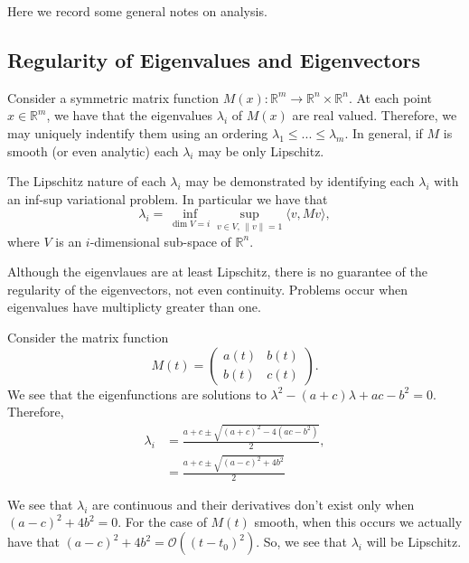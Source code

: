 Here we record some general notes on analysis.

\subsection{Regularity of Eigenvalues and Eigenvectors}

Consider a symmetric matrix function $M(x): \mathbb R^m \to \mathbb R^n\times \mathbb R^n$. At each point $x\in \mathbb R^m$, we have that the eigenvalues $\lambda_i$ of $M(x)$ are real valued. Therefore, we may uniquely indentify them using an ordering $\lambda_1 \leq ... \leq \lambda_m$. In general, if $M$ is smooth (or even analytic) each $\lambda_i$ may be only Lipschitz.

The Lipschitz nature of each $\lambda_i$ may be demonstrated by identifying each $\lambda_i$ with an inf-sup variational problem. In particular we have that
\begin{equation}
\lambda_i = \inf\limits_{\dim V = i} \sup\limits_{v\in V, \, \|v\| = 1} \langle v, Mv\rangle,
\end{equation}
where $V$ is an $i$-dimensional sub-space of $\mathbb R^n$.

Although the eigenvlaues are at least Lipschitz, there is no guarantee of the regularity of the eigenvectors, not even continuity. Problems occur when eigenvalues have multiplicty greater than one.

Consider the matrix function
\begin{equation}
M(t) = \begin{pmatrix}
a(t) & b(t)\\
b(t) & c(t)
\end{pmatrix}.
\end{equation}
We see that the eigenfunctions are solutions to $\lambda^2 - (a + c)\lambda + ac-b^2 = 0$. Therefore,
\begin{align}
\lambda_i & = \frac{a+c \pm \sqrt{(a+c)^2 - 4(ac - b^2)}}{2},\\
& = \frac{a+c \pm \sqrt{(a-c)^2 + 4 b^2}}{2}
\end{align}

We see that $\lambda_i$ are continuous and their derivatives don't exist only when $(a-c)^2 + 4b^2 = 0.$ For the case of $M(t)$ smooth, when this occurs we actually have that $(a-c)^2 + 4b^2 = \mathcal O((t-t_0)^2).$ So, we see that $\lambda_i$ will be Lipschitz.

